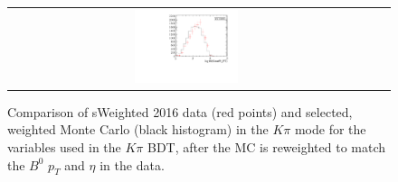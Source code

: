 \begin{figure}
\begin{tabular}{ccc}
\includegraphics[width=0.3\textwidth]{ANA_resources/Plots/Monte_carlo/data_vs_MC/weight/Kpi/log10(KstarPi_PT)_2016.pdf} & & \\
\end{tabular}
\caption{Comparison of sWeighted 2016 data (red points) and selected, weighted Monte Carlo (black histogram) in the $K\pi$ mode for the variables used in the $K\pi$ BDT, after the MC is reweighted to match the $B^0$ $p_{T}$ and $\eta$ in the data.}
\label{fig:data_vs_MC_Kpi_2016}
\end{figure}
